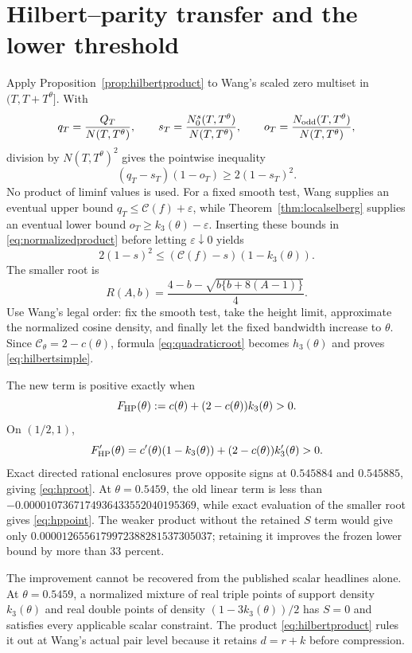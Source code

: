 \documentclass[11pt]{article}
\theoremstyle{remark}
\begin{document}
\section{Hilbert--parity transfer and the lower threshold}
\label{sec:hilberttransfer}

Apply Proposition~\ref{prop:hilbertproduct} to Wang's scaled zero multiset
in $(T,T+T^\theta]$. With
\[
 q_T=\frac{Q_T}{N(T,T^\theta)},\qquad
 s_T=\frac{N_0^s(T,T^\theta)}{N(T,T^\theta)},\qquad
 o_T=\frac{N_{\rm odd}(T,T^\theta)}{N(T,T^\theta)},
\]
division by $N(T,T^\theta)^2$ gives the pointwise inequality
\begin{equation}\label{eq:normalizedproduct}
 (q_T-s_T)(1-o_T)\ge2(1-s_T)^2.
\end{equation}
No product of liminf values is used. For a fixed smooth test, Wang supplies
an eventual upper bound $q_T\le\mathcal C(f)+\varepsilon$, while
Theorem~\ref{thm:localselberg} supplies an eventual lower bound
$o_T\ge k_3(\theta)-\varepsilon$. Inserting these bounds in
\eqref{eq:normalizedproduct} before letting $\varepsilon\downarrow0$ yields
\[
 2(1-s)^2\le(\mathcal C(f)-s)(1-k_3(\theta)).
\]
The smaller root is
\begin{equation}\label{eq:quadraticroot}
 R(A,b)=\frac{4-b-\sqrt{b\{b+8(A-1)\}}}{4}.
\end{equation}
Use Wang's legal order: fix the smooth test, take the height limit, approximate
the normalized cosine density, and finally let the fixed bandwidth increase
to $\theta$. Since $\mathcal C_\theta=2-c(\theta)$, formula
\eqref{eq:quadraticroot} becomes $h_3(\theta)$ and proves
\eqref{eq:hilbertsimple}.

The new term is positive exactly when
\begin{equation}\label{eq:hpfunction}
 F_{\rm HP}(\theta):=c(\theta)+(2-c(\theta))k_3(\theta)>0.
\end{equation}
On $(1/2,1)$,
\[
 F_{\rm HP}'(\theta)=c'(\theta)(1-k_3(\theta))+
 (2-c(\theta))k_3'(\theta)>0.
\]
Exact directed rational enclosures prove opposite signs at $0.545884$ and
$0.545885$, giving \eqref{eq:hproot}. At $\theta=0.5459$, the old linear
term is less than $-0.0000107367174936433552040195369$, while exact
evaluation of the smaller root gives \eqref{eq:hppoint}. The weaker product
without the retained $S$ term would give only
$0.0000126556179972388281537305037$; retaining it improves the frozen lower
bound by more than $33$ percent.

The improvement cannot be recovered from the published scalar headlines
alone. At $\theta=0.5459$, a normalized mixture of real triple points of
support density $k_3(\theta)$ and real double points of density
$(1-3k_3(\theta))/2$ has $S=0$ and satisfies every applicable scalar
constraint. The product \eqref{eq:hilbertproduct} rules it out at Wang's
actual pair level because it retains $d=r+k$ before compression.
\end{document}

